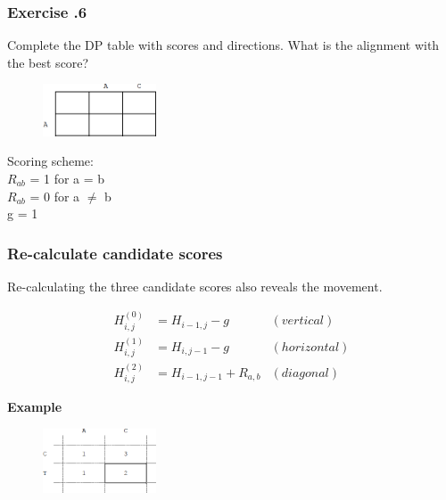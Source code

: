 %
%
\subsubsection*{Exercise \thesection.6}
	
Complete the DP table with scores and directions. What is the alignment with the best score?

\begin{multicols}{2}
\begin{figure}[H]
  \centering
      \includegraphics[width=0.3\textwidth]{fig02/back_tracking_store_moves_exercise.png}
\end{figure}

\noindent Scoring scheme: \\ 
$R_{ab}$ = 1 for a = b \\ 
$R_{ab}$ = 0 for a $\neq$ b \\ 
g = 1

\end{multicols} 

%
%
\subsubsection*{Re-calculate candidate scores}

Re-calculating the three candidate scores also reveals the movement.

\begin{align*}
H_{i,j}^{(0)} &= H_{i-1,j} - g &(vertical) \\
H_{i,j}^{(1)} &= H_{i,j-1} - g &(horizontal) \\
H_{i,j}^{(2)} &= H_{i-1,j-1} + R_{a,b} &(diagonal)
\end{align*}

\noindent \textbf{Example}

\begin{figure}[H]
  \centering
      \includegraphics[width=0.3\textwidth]{fig02/back_tracking_example.png}
\end{figure}
				
